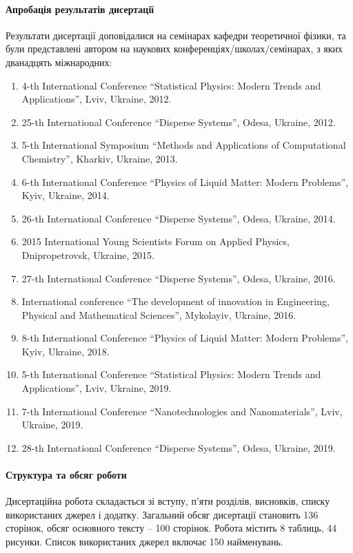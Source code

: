 \paragraph{Апробація результатів дисертації}\hfill\par
Результати дисертації доповідалися на семінарах кафедри теоретичної 
фізики, та були представлені автором на наукових
конференціях/школах/семіна\-рах, з яких дванадцять міжнародних:
\begin{enumerate}[leftmargin=1cm] %
	\item 4-th International Conference ``Statistical Physics: Modern Trends and Applications'', Lviv, Ukraine, 2012.
	\item 25-th International Conference ``Disperse Systems'', Odesa, Ukraine, 2012.
	\item 5-th International Symposium ``Methods and Applications of Computational Chemistry'',  Kharkiv, Ukraine, 2013.
	\item 6-th International Conference ``Physics  of  Liquid  Matter:  Modern Prob\-lems'',  Kyiv, Ukraine, 2014.
	\item 26-th International Conference ``Disperse Systems'',  Odesa, Ukraine, 2014.
	\item 2015 International Young Scientists Forum on Applied Physics,  Dnipropetrovsk, Ukraine, 2015.
	\item 27-th International Conference ``Disperse Systems'', Odesa, Ukraine, 2016.
	\item International conference ``The development of innovation in Engineering, Physical and Mathematical Sciences'', Mykolayiv, Ukraine, 2016.
	\item 8-th International  Conference ``Physics  of  Liquid  Matter: Modern Prob\-lems'', Kyiv, Ukraine, 2018.
	\item 5-th International Conference ``Statistical Physics: Modern Trends and Applications'', Lviv, Ukraine, 2019.
	\item 7-th International Conference ``Nanotechnologies and Nanomaterials'',  Lviv, Ukraine, 2019.
	\item 28-th International Conference ``Disperse Systems'', Odesa, Ukraine, 2019.
\end{enumerate}


\paragraph{Структура та обсяг роботи}\hfill\par
Дисертаційна робота складається зі вступу, п'яти розділів, висновків, списку використаних джерел і додатку. Загальний обсяг дисертації становить 136 сторінок, обсяг основного тексту -- 100 сторінок. Робота містить 8 таблиць, 44 рисунки. Список використаних джерел включає 150 найменувань.
